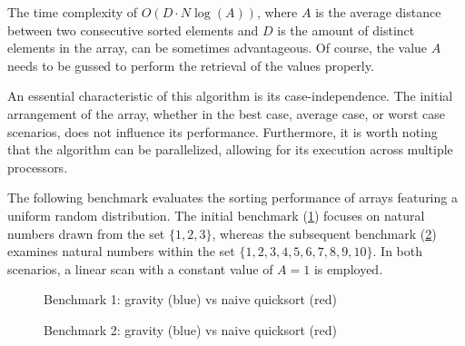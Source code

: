 \documentclass{article}
\begin{document}
The time complexity of \(O(D \cdot N \log(A))\), where \(A\)
is the average distance between two consecutive sorted
elements and \(D\) is the amount of distinct elements in the array,
can be sometimes advantageous.
Of course, the value \(A\) needs to be gussed to perform the retrieval of the values properly.

An essential characteristic of this algorithm is its case-independence. The initial arrangement of the array, whether in the best case, average case, or worst case scenarios, does not influence its performance.
Furthermore, it is worth noting that the algorithm can be parallelized,
allowing for its execution across multiple processors.

\pagebreak

The following benchmark evaluates the sorting performance of arrays featuring a uniform random distribution.
The initial benchmark (\ref{fig:bench1}) focuses on natural numbers drawn from the set \(\{1, 2, 3\}\),
whereas the subsequent benchmark (\ref{fig:bench2}) examines natural numbers within the set \(\{1, 2, 3, 4, 5, 6, 7, 8, 9, 10\}\).
In both scenarios, a linear scan with a constant value of \(A=1\) is employed.

\begin{figure}[ht]
\centering
{}
\caption{Benchmark 1: gravity (blue) vs naive quicksort (red)}
\label{fig:bench1}
\end{figure}

\begin{figure}[ht]
\centering
{}
\caption{Benchmark 2: gravity (blue) vs naive quicksort (red)}
\label{fig:bench2}
\end{figure}

\pagebreak

\nocite{*} %

\printbibliography
\listoffigures
\end{document}
